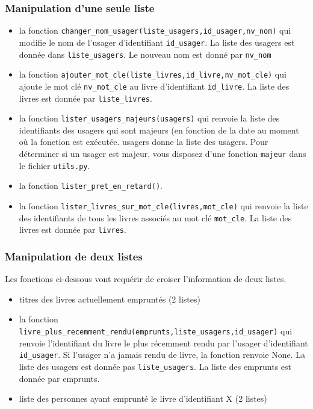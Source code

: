 \documentclass[10pt,a4paper,onecolumn]{article}
\begin{document}
\subsubsection{Manipulation d'une seule liste}

\begin{itemize}

\item la fonction \texttt{changer\_nom\_usager(liste\_usagers,id\_usager,nv\_nom)} qui modifie le nom de l'usager d'identifiant \texttt{id\_usager}. La liste des usagers est donnée dans \texttt{liste\_usagers}. Le nouveau nom est donné par \texttt{nv\_nom}

\item la fonction \texttt{ajouter\_mot\_cle(liste\_livres,id\_livre,nv\_mot\_cle)} qui ajoute le mot clé \texttt{nv\_mot\_cle} au livre d'identifiant \texttt{id\_livre}. La liste des livres est donnée par \texttt{liste\_livres}.

\item la fonction \texttt{lister\_usagers\_majeurs(usagers)} qui renvoie la liste des identifiants des usagers qui sont majeurs (en fonction de la date au moment où la fonction est exécutée. usagers donne la liste des usagers. Pour déterminer si un usager est majeur, vous disposez d'une fonction \texttt{majeur} dans le fichier \texttt{utils.py}.

\item la fonction \texttt{lister\_pret\_en\_retard()}.

\item la fonction \texttt{lister\_livres\_sur\_mot\_cle(livres,mot\_cle)} qui renvoie la liste des identifiants de tous les livres associés au mot clé \texttt{mot\_cle}. La liste des livres est donnée par \texttt{livres}.

\end{itemize}

\subsubsection{Manipulation de deux listes}

Les fonctions ci-dessous vont requérir de croiser l'information de deux listes.

\begin{itemize}


\item titres des livres actuellement empruntés (2 listes)

\item la fonction \texttt{livre\_plus\_recemment\_rendu(emprunts,liste\_usagers,id\_usager)} qui renvoie l'identifiant du livre le plus récemment rendu par l'usager d'identifiant \texttt{id\_usager}. Si l'usager n'a jamais rendu de livre, la fonction renvoie None. La liste des usagers est donnée pas \texttt{liste\_usagers}. La liste des emprunts est donnée par emprunts.

\item liste des personnes ayant emprunté le livre d'identifiant X (2 listes)

\end{itemize}
\end{document}
